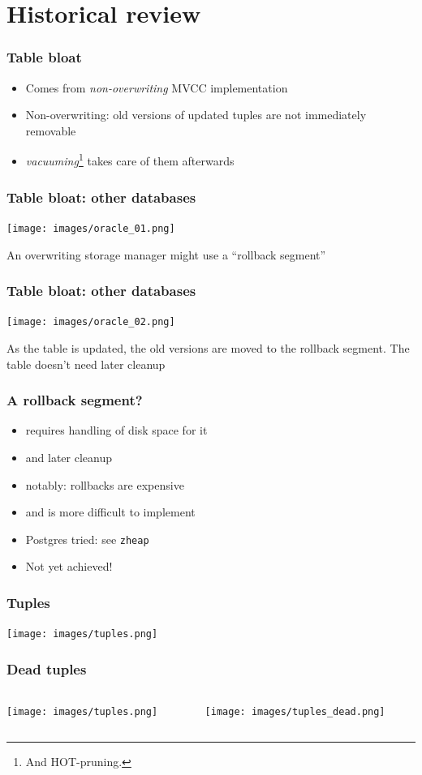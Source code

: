 \section{Historical review}

\begin{frame}
  \frametitle{Table bloat}
  \begin{itemize}
    \item Comes from \emph{non-overwriting} MVCC implementation
    \item Non-overwriting: old versions of updated tuples are not immediately removable
    \item \emph{vacuuming}\footnote{And HOT-pruning.} takes care of them afterwards
  \end{itemize}
\end{frame}

\begin{frame}
  \frametitle{Table bloat: other databases}
  \texttt{[image: images/oracle\_01.png]}

  An overwriting storage manager might use a ``rollback segment''
\end{frame}

\begin{frame}
  \frametitle{Table bloat: other databases}
  \texttt{[image: images/oracle\_02.png]}

  As the table is updated, the old versions are moved to the rollback segment. The table doesn't need later cleanup
\end{frame}

\begin{frame}
  \frametitle{A rollback segment?}
  \begin{itemize}
    \item requires handling of disk space for it
    \item and later cleanup
    \item notably: rollbacks are expensive
    \item<2> and is more difficult to implement
    \item<2> Postgres tried: see \texttt{zheap}
    \item<2> Not yet achieved!
  \end{itemize}
\end{frame}

\begin{frame}
  \frametitle{Tuples}
  \texttt{[image: images/tuples.png]}
\end{frame}

\begin{frame}
  \frametitle{Dead tuples}
  \begin{columns}
    \begin{column}{0.5\textwidth}
      \texttt{[image: images/tuples.png]}
    \end{column}
    \begin{column}{0.8\textwidth}
      \texttt{[image: images/tuples\_dead.png]}
    \end{column}
  \end{columns}
\end{frame}

